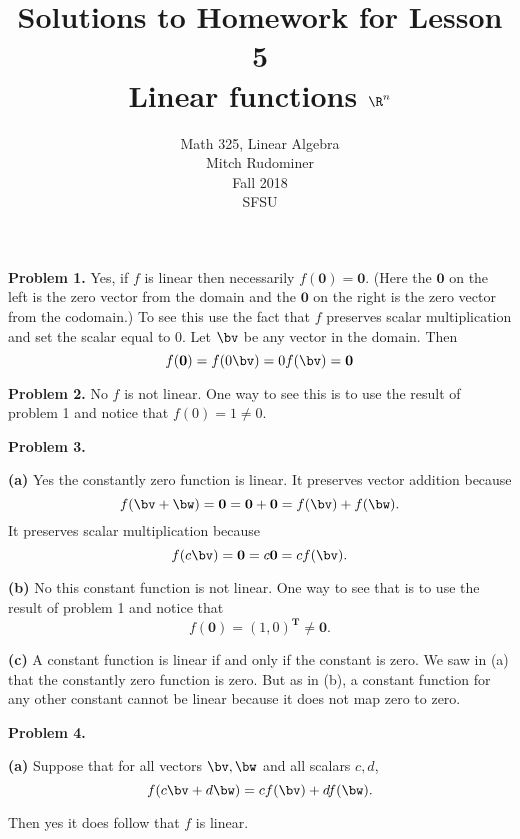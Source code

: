 \documentclass[oneside,12pt]{amsart}
\begin{document}
\title{Solutions to Homework for Lesson 5 \\ Linear functions $\R^n$}
\author{Math 325, Linear Algebra \\ Mitch Rudominer \\ Fall 2018 \\ SFSU }
\date{}

\maketitle

\textbf{Problem 1.} Yes, if $f$ is linear then necessarily
$f(\mathbf{0}) = \mathbf{0}$. (Here the $\mathbf{0}$ on the left is the
zero vector from the domain and the $\mathbf{0}$ on the right is the zero vector
from the codomain.) To see this use the fact that $f$ preserves scalar multiplication
and set the scalar equal to 0. Let $\bv$ be any vector in the domain. Then
$$f(\mathbf{0}) = f(0 \bv) = 0 f(\bv) = \mathbf{0}$$

\smallskip

\textbf{Problem 2.} No $f$ is not linear. One way to see this is to use the
result of problem 1 and notice that $f(0) = 1 \not= 0$.

\smallskip

\textbf{Problem 3.}

\textbf{(a)} Yes the constantly zero function is linear. It preserves vector
addition because
$$f(\bv + \bw) = \mathbf{0} = \mathbf{0} + \mathbf{0} = f(\bv) + f(\bw).$$
It preserves scalar multiplication because
$$f(c \bv) = \mathbf{0} = c \mathbf{0} = c f(\bv).$$

\smallskip

\textbf{(b)} No this constant function is not linear. One way to see that is
to use the result of problem 1 and notice that
$$f(\mathbf{0}) = (1, 0)^{\textbf{T}} \not= \mathbf{0}.$$

\smallskip

\textbf{(c)} A constant function is linear if and only if the constant is zero.
We saw in (a) that the constantly zero function is zero. But as in (b), a constant
function for any other constant cannot be linear because it does not map
zero to zero.

\smallskip

\textbf{Problem 4.}


\textbf{(a)} Suppose that for all vectors $\bv, \bw$ and all scalars $c, d$,
$$f(c\bv + d\bw) = c f(\bv) + d f (\bw).$$

Then yes it does follow that $f$ is linear.
\end{document}
